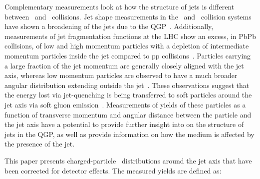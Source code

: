 Complementary measurements look at how the structure of jets is different between \pbpb\ and \pp\ collisions.
Jet shape measurements in the \pp\ and \pbpb\ collision systems have shown a broadening of the jets due to the QGP~\cite{Aad:2011sc, Acharya:2018uvf, Chatrchyan:2012mec, Chatrchyan:2013kwa}.
Additionally, measurements of jet fragmentation functions at the LHC show an excess, in PbPb collisions, of low and high momentum particles with a depletion of intermediate momentum particles inside the jet compared to pp collisions~\cite{Aad:2014wha,Chatrchyan:2014ava,Aaboud:2017bzv,Aaboud:2018hpb}.
Particles carrying a large fraction of the jet momentum are generally closely aligned with the jet axis, whereas low momentum particles are observed to have a much broader angular distribution extending outside the jet~\cite{Chatrchyan:2011sx,Khachatryan:2015lha,Khachatryan:2016tfj,Sirunyan:2018jqr}.
These observations suggest that the energy lost via jet-quenching is being transferred to soft particles around the jet axis via soft gluon emission~\cite{Vitev:2008rz,Ovanesyan:2011xy,Blaizot:2014ula,Qin:2015srf,Escobedo:2016jbm,Casalderrey-Solana:2016jvj,Tachibana:2017syd}.
Measurements of yields of these particles as a function of transverse momentum and angular distance between the particle and the jet axis have a potential to provide further insight into on the structure of jets in the QGP, as well as provide information on how the medium is affected by the presence of the jet.


This paper presents charged-particle \pt\ distributions around the jet axis that have been corrected for detector effects.
The measured yields are defined as:

